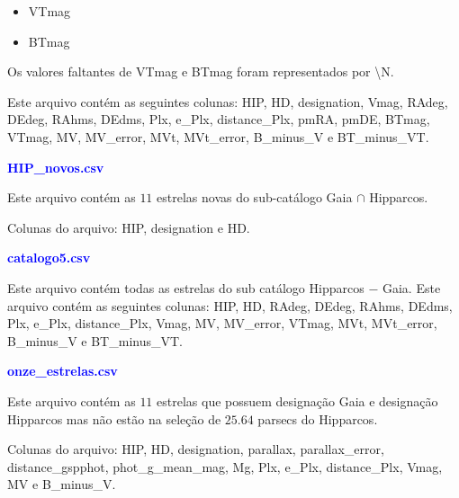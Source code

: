 \documentclass{article}
\begin{document}
	\begin{itemize}
		\item VTmag
		\item BTmag
	\end{itemize}

	Os valores faltantes de VTmag e BTmag foram representados por \textbackslash N.
	
	Este arquivo contém as seguintes colunas:
	HIP, HD, designation, Vmag, RAdeg, DEdeg, RAhms, DEdms, Plx, e\_Plx, distance\_Plx, pmRA, pmDE, BTmag, VTmag, MV, MV\_error, MVt, MVt\_error, B\_minus\_V e BT\_minus\_VT.
			
	\vspace{10pt}

	\textcolor{blue}{\textbf{HIP\_novos.csv}}
	
	\vspace{10pt}
	
	Este arquivo contém as $11$ estrelas novas do sub-catálogo  Gaia $\cap$ Hipparcos. 
	
	Colunas do arquivo:
	HIP, designation e HD.
	
	\vspace{10pt}
	
	\textcolor{blue}{\textbf{catalogo5.csv}}
	
	\vspace{10pt}
	
	Este arquivo contém todas as estrelas do sub catálogo Hipparcos $-$ Gaia.
	Este arquivo contém as seguintes colunas:
	HIP, HD, RAdeg, DEdeg, RAhms, DEdms, Plx, e\_Plx, distance\_Plx, Vmag, MV, MV\_error, VTmag, MVt, MVt\_error, B\_minus\_V e BT\_minus\_VT.

	\vspace{10pt}

	\textcolor{blue}{\textbf{onze\_estrelas.csv}}
	
	\vspace{10pt}
	
	Este arquivo contém as $11$ estrelas  que possuem designação Gaia e designação Hipparcos mas não estão na seleção de $25.64$ parsecs do Hipparcos.
	
	Colunas do arquivo:
	HIP, HD, designation, parallax, parallax\_error, distance\_gspphot, phot\_g\_mean\_mag, Mg, Plx, e\_Plx, distance\_Plx, Vmag, MV e B\_minus\_V.
\end{document}
